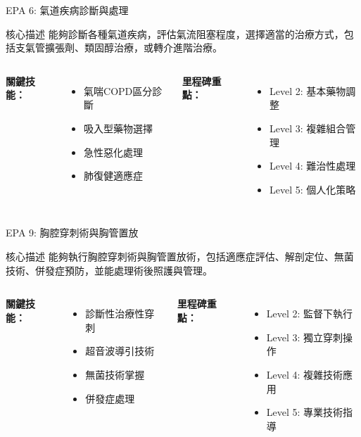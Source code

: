 \documentclass[aspectratio=169]{beamer}
\begin{document}
\begin{frame}{EPA 6: 氣道疾病診斷與處理}
\begin{alertblock}{核心描述}
能夠診斷各種氣道疾病，評估氣流阻塞程度，選擇適當的治療方式，包括支氣管擴張劑、類固醇治療，或轉介進階治療。
\end{alertblock}

\begin{columns}[c]
\textbf{關鍵技能：}
\begin{itemize}
\item 氣喘COPD區分診斷
\item 吸入型藥物選擇
\item 急性惡化處理
\item 肺復健適應症
\end{itemize}

\textbf{里程碑重點：}
\begin{itemize}
\item Level 2: 基本藥物調整
\item Level 3: 複雜組合管理
\item Level 4: 難治性處理
\item Level 5: 個人化策略
\end{itemize}
\end{columns}
\end{frame}

\begin{frame}{EPA 9: 胸腔穿刺術與胸管置放}
\begin{alertblock}{核心描述}
能夠執行胸腔穿刺術與胸管置放術，包括適應症評估、解剖定位、無菌技術、併發症預防，並能處理術後照護與管理。
\end{alertblock}

\begin{columns}[c]
\textbf{關鍵技能：}
\begin{itemize}
\item 診斷性治療性穿刺
\item 超音波導引技術
\item 無菌技術掌握
\item 併發症處理
\end{itemize}

\textbf{里程碑重點：}
\begin{itemize}
\item Level 2: 監督下執行
\item Level 3: 獨立穿刺操作
\item Level 4: 複雜技術應用
\item Level 5: 專業技術指導
\end{itemize}
\end{columns}
\end{frame}
\end{document}
